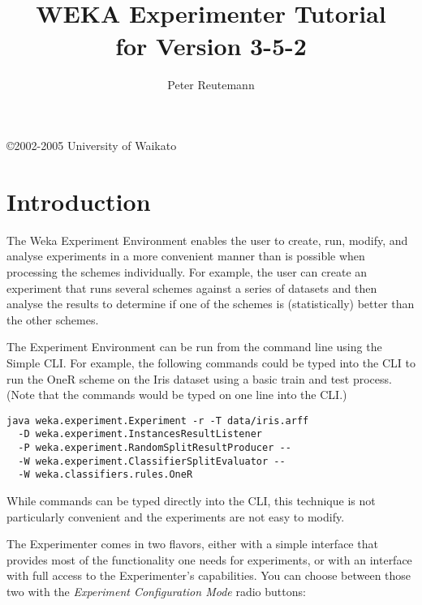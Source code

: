 \documentclass[a4paper]{article}
\title{\epsfig{file=images/coat_of_arms.eps,width=10cm}\vspace{3cm}\\WEKA Experimenter Tutorial\\for Version 3-5-2}
\author{Peter Reutemann}
\begin{document}
\begin{titlepage}

\maketitle
\thispagestyle{empty}

\center
\vspace{8cm}

\copyright 2002-2005 University of Waikato

\end{titlepage}

\tableofcontents


\newpage
\section{Introduction}

The Weka Experiment Environment enables the user to create, run, modify, and analyse experiments in a more convenient manner than is possible when processing the schemes individually. For example, the user can create an experiment that runs several schemes against a series of datasets and then analyse the results to determine if one of the schemes is (statistically) better than the other schemes.

The Experiment Environment can be run from the command line using the Simple CLI. For example, the following commands could be typed into the CLI to run the OneR scheme on the Iris dataset using a basic train and test process. (Note that the commands would be typed on one line into the CLI.)

\begin{verbatim}
java weka.experiment.Experiment -r -T data/iris.arff
  -D weka.experiment.InstancesResultListener
  -P weka.experiment.RandomSplitResultProducer --
  -W weka.experiment.ClassifierSplitEvaluator --
  -W weka.classifiers.rules.OneR
\end{verbatim}

While commands can be typed directly into the CLI, this technique is not particularly convenient and the experiments are not easy to modify.

The Experimenter comes in two flavors, either with a simple interface that provides most of the functionality one needs for experiments, or with an interface with full access to the Experimenter's capabilities. You can choose between those two with the \textit{Experiment Configuration Mode} radio buttons:
\end{document}
